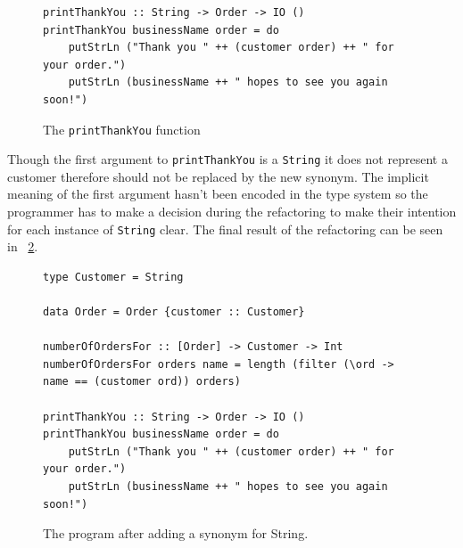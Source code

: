 \begin{figure}[t]
\begin{lstlisting}
printThankYou :: String -> Order -> IO ()
printThankYou businessName order = do
	putStrLn ("Thank you " ++ (customer order) ++ " for your order.")
	putStrLn (businessName ++ " hopes to see you again soon!")
\end{lstlisting}
\caption{The \texttt{printThankYou} function}
\DIFaddbeginFL \label{printTY}
\DIFaddendFL \end{figure}

Though the first argument to \texttt{printThankYou} is a \texttt{String} it does not represent a customer therefore should not be replaced by the new synonym. The implicit meaning of the first argument hasn't been encoded in the type system so the programmer has to make a decision during the refactoring to make their intention for each instance of \texttt{String} clear. The final result of the refactoring can be seen in \DIFdelbegin {}\DIFdelend \DIFaddbegin {}\DIFaddend ~\ref{orderRefact}. 

\begin{figure}[t]
	\DIFdelbeginFL %



\DIFdelendFL \DIFaddbeginFL \begin{lstlisting}
type Customer = String

data Order = Order {customer :: Customer}

numberOfOrdersFor :: [Order] -> Customer -> Int
numberOfOrdersFor orders name = length (filter (\ord -> name == (customer ord)) orders)

printThankYou :: String -> Order -> IO ()
printThankYou businessName order = do
	putStrLn ("Thank you " ++ (customer order) ++ " for your order.")
	putStrLn (businessName ++ " hopes to see you again soon!")
	\end{lstlisting}
	\DIFaddendFL \caption{The program after adding a synonym for String.}\DIFaddbeginFL \label{orderRefact}
\DIFaddendFL \end{figure}

